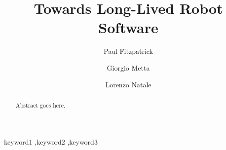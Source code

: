 \begin{frontmatter}



\title{Towards Long-Lived Robot Software}


\author[at_iit]{Paul Fitzpatrick}
\author[at_iit,at_dist]{Giorgio Metta}
\author[at_iit]{Lorenzo Natale}

\address[at_iit]{IIT Address}
\address[at_dist]{DIST Address}

\begin{abstract}

Abstract goes here.  


\end{abstract}

\begin{keyword}

keyword1 \sep keyword2 \sep keyword3


\end{keyword}

\end{frontmatter}


